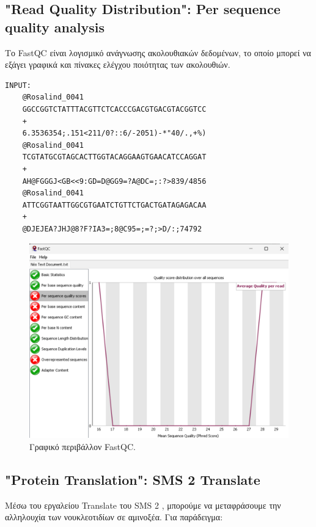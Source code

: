     \subsection{"Read Quality Distribution": Per sequence quality analysis}
        Το FastQC \cite{FastQC} είναι λογισμικό ανάγνωσης ακολουθιακών δεδομένων, το οποίο μπορεί να εξάγει γραφικά και πίνακες ελέγχου ποιότητας των ακολουθιών.
    \begin{graycomment} \footnotesize
    \begin{verbatim}
INPUT:
    @Rosalind_0041
    GGCCGGTCTATTTACGTTCTCACCCGACGTGACGTACGGTCC
    +
    6.3536354;.151<211/0?::6/-2051)-*"40/.,+%)
    @Rosalind_0041
    TCGTATGCGTAGCACTTGGTACAGGAAGTGAACATCCAGGAT
    +
    AH@FGGGJ<GB<<9:GD=D@GG9=?A@DC=;:?>839/4856
    @Rosalind_0041
    ATTCGGTAATTGGCGTGAATCTGTTCTGACTGATAGAGACAA
    +
    @DJEJEA?JHJ@8?F?IA3=;8@C95=;=?;>D/:;74792\end{verbatim}
    \end{graycomment}
    \begin{figure}[H] \noindent \centering
        \includegraphics[scale=0.55]{img/FastQC}
        \caption{Γραφικό περιβάλλον FastQC.}
    \end{figure}

    \subsection{"Protein Translation": SMS 2 Translate}
        Μέσω του εργαλείου Translate του SMS 2 \cite{Translate}, μπορούμε να μεταφράσουμε την αλληλουχία των νουκλεοτιδίων σε αμινοξέα. Για παράδειγμα:

